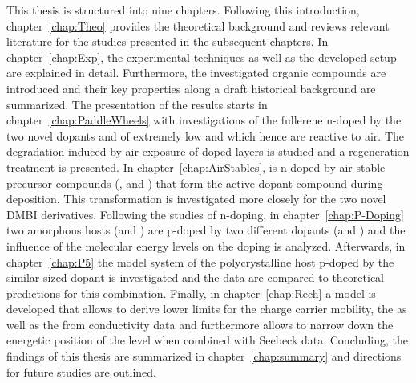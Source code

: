 This thesis is structured into nine chapters. Following this introduction, chapter~\ref{chap:Theo} provides the theoretical background and reviews relevant literature for the studies presented in the subsequent chapters. In chapter~\ref{chap:Exp},
the experimental techniques as well as the developed setup are explained in detail. Furthermore, the investigated organic compounds are introduced and their key properties along a draft historical background are summarized.
The presentation of the results starts in chapter~\ref{chap:PaddleWheels} with investigations of the fullerene \CS n-doped by the two novel dopants \CrPd and \WPd of extremely low \IEs and which hence are reactive to air. The degradation induced by air-exposure of doped layers is studied and a regeneration treatment is presented.
In chapter~\ref{chap:AirStables}, \CS is n-doped by air-stable precursor compounds (\aob, \dmbi and \meodmbiI) that form the active dopant compound during deposition. This transformation is investigated more closely for the two novel DMBI derivatives.
Following the studies of n-doping, in chapter~\ref{chap:P-Doping} two amorphous hosts (\meo and \lili) are p-doped by two different dopants (\FS and \CSF) and the influence of the molecular energy levels on the doping is analyzed.
Afterwards, in chapter~\ref{chap:P5} the model system of the polycrystalline host \pen p-doped by the similar-sized dopant \FV is investigated and the data are compared to theoretical predictions for this combination.
Finally, in chapter~\ref{chap:Rech} a model is developed that allows to derive lower limits for the charge carrier mobility, the \nLong as well as the \DopEffLong from conductivity data and furthermore allows to narrow down the energetic position of the \EtLong level when combined with Seebeck data.
Concluding, the findings of this thesis are summarized in chapter~\ref{chap:summary} and directions for future studies are outlined.


